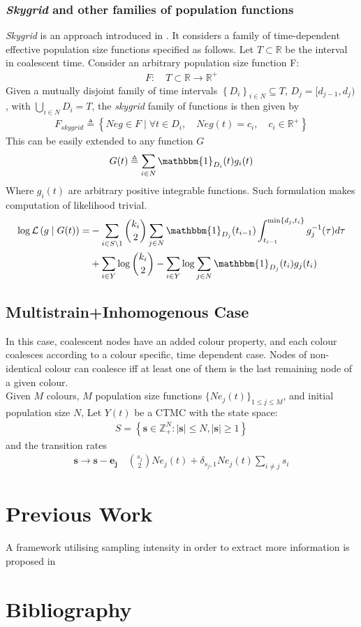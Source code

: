 \documentclass{article}
\newcommand{\R}{\mathbb{R}}
\newcommand{\Z}{\mathbb{Z}}
\theoremstyle{definition}
\begin{document}
\subsubsection{\textit{Skygrid} and other families of population functions}
\textit{Skygrid} is an approach introduced in \cite{gill_improving_2013}. It considers a family of time-dependent effective population size functions specified as follows. Let $T\subset\R$ be the interval in coalescent time. Consider an arbitrary population size function F:
\begin{gather}
  F:\quad T\subset\R \rightarrow \R^+
\end{gather}
Given a mutually disjoint family of time intervals $\left\{D_i\right\}_{i\in N}\subseteq T$, $D_j = [d_{j-1}, d_{j})$,  with $\bigcup\limits_{i\in N} D_i = T$, the \textit{skygrid} family of functions is then given by 
\begin{gather}
F_{skygrid}\triangleq\left\{Neg\in F\mid\forall t \in D_i,\quad Neg(t) = c_i,\quad c_i\in\R^+\right\}
\end{gather}
This can be easily extended to any function $G$
\begin{gather}
 G(t)\triangleq\sum_{i\in N}{\mathbbm{1}_{D_i}(t)g_i(t)}
\end{gather}
Where $g_i(t)$ are arbitrary positive integrable functions.
Such formulation makes computation of likelihood trivial.
\begin{gather}
\begin{aligned}
\log\mathcal{L}\left(g\mid G(t)\right) 
=& -\sum_{i\in S\setminus 1}{
\binom{k_i}{2}\sum_{j\in N}{\mathbbm{1}_{D_j}(t_{i-1})
\int_{t_{i-1}}^{\min\{d_j, t_i\}}{g^{-1}_j(\tau)d\tau}}}\\
&+\sum_{i\in Y}{\log\binom{k_i}{2}} - \sum_{i\in Y}{\log{\sum_{j\in N}{\mathbbm{1}_{D_j}(t_i)g_j(t_i)}}}
\end{aligned}
\end{gather}

\subsection{Multistrain+Inhomogenous Case}
In this case, coalescent nodes have an added colour property, and each colour coalesces according to a colour specific, time dependent case. Nodes of non-identical colour can coalesce iff at least one of them is the last remaining node of a given colour.\\
Given $M$ colours, $M$ population size functions $\{Ne_j(t)\}_{1\leq j\leq M}$, and initial population size $N$, Let $Y(t)$ be a CTMC with the state space:
\begin{gather}
  S = \left\{\mathbf{s}\in \Z_+^{N}:|\mathbf{s}|\leq N, |\mathbf{s}|\geq1\right\}
\end{gather}
and the transition rates
\begin{gather}
\mathbf{s}\to\mathbf{s}-\mathbf{e_j} \quad \binom{s_j}{2}Ne_j(t)+\delta_{s_j, 1}Ne_j(t)\sum_{i\neq j}s_i
\end{gather}
\section{Previous Work}
A framework utilising sampling intensity in order to extract more information is proposed in \cite{parag_jointly_nodate}
\section{Bibliography}
\printbibliography
\end{document}
